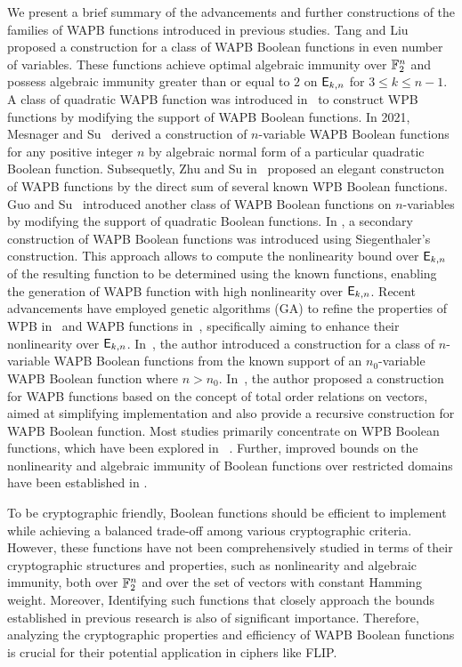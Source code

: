 \documentclass{llncs}
\begin{document}
We present a brief summary of the advancements and further constructions of the families of WAPB functions introduced in previous studies. Tang and Liu~\cite{CC:TangLiu19} proposed a construction for a class of WAPB Boolean functions in even number of variables. These functions achieve optimal algebraic immunity over $\mathbb{F}_2^n$ and possess algebraic immunity greater than or equal to $2$ on $\mathsf{E}_{k,n}$ for $3 \leq k \leq n-1$.
A class of quadratic WAPB function was introduced in~\cite{DAM:LiSu20} to construct WPB functions by modifying the support of WAPB Boolean functions. In 2021, Mesnager and Su~\cite{CC:MesSu21} derived a construction of $n$-variable WAPB Boolean functions for any positive integer $n$ by algebraic normal form of a particular quadratic Boolean function. Subsequetly, Zhu and Su in~\cite{DAM:ZhuSu22} proposed an elegant constructon of WAPB functions by the direct sum of several known WPB Boolean functions. Guo and Su~\cite{DAM:GuoSu22} introduced another class of WAPB Boolean functions on $n$-variables by modifying the support of quadratic Boolean functions. In \cite{INDO:GinMea22}, a secondary construction of WAPB Boolean functions was introduced using Siegenthaler's construction. This approach allows to compute the nonlinearity bound over $\mathsf{E}_{k,n}$ of the resulting function to be determined using the known functions, enabling the generation of WAPB function with high nonlinearity over $\mathsf{E}_{k,n}$. Recent advancements have employed genetic algorithms (GA) to refine the properties of WPB in~ \cite{CEC:MPJDL22} and WAPB functions in~\cite{ASIACCS:YCL+23}, specifically aiming to enhance their nonlinearity over $\mathsf{E}_{k,n}$. In~\cite{AMC:DM24}, the author introduced a construction for a class of $n$-variable WAPB Boolean functions from the known support of an $n_0$-variable WAPB Boolean function where $n > n_0$. In~\cite{SAC:Meaux24}, the author proposed a construction for WAPB functions based on the concept of total order relations on vectors, aimed at simplifying implementation and also provide a recursive construction for WAPB Boolean function.
Most studies primarily concentrate on WPB Boolean functions, which have been explored in  ~\cite{DCC:LiuMes19,CC:MesSu21,DAM:Su21,CEC:MPJDL22,C2SI:GinMea23,Latin:GinMea23,DAM:ZLCQZ23,BFA:DM23,AMC:ZhangSu23,Mat:ZJZQ23,CCDS:GinMea24}. Further, improved bounds on the nonlinearity and algebraic immunity of Boolean functions over restricted domains have been established in \cite{IC:MMMRS18,CC:MSLZ22,DAM:GinMea22,C2SI:GinMea23,Latin:GinMea23}. 

To be cryptographic friendly, Boolean functions should be efficient to implement while achieving a balanced trade-off among various cryptographic criteria. However, these functions have not been comprehensively studied in terms of their cryptographic structures and properties, such as nonlinearity and algebraic immunity, both over $\mathbb{F}_2^n$ and over the set of vectors with constant Hamming weight. Moreover, Identifying such functions that closely approach the bounds established in previous research is also of significant importance. Therefore, analyzing the cryptographic properties and efficiency of WAPB Boolean functions is crucial for their potential application in ciphers like FLIP. 
\end{document}
